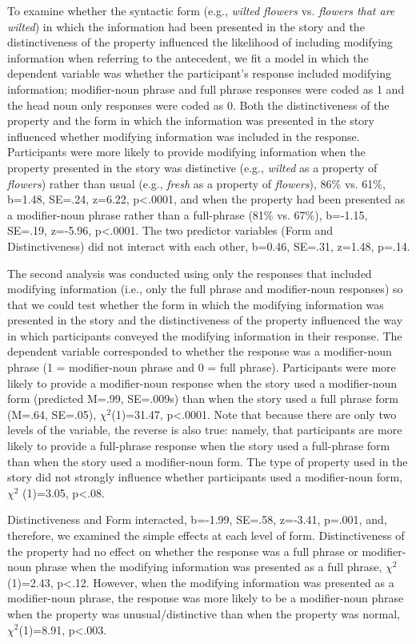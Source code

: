 \documentclass[output=paper]{langsci/langscibook}
\begin{document}
To examine whether the syntactic form (e.g., \textit{wilted flowers}
vs. \textit{flowers that are wilted}) in which the information had
been presented in the story and the distinctiveness of the property
influenced the likelihood of including modifying information when
referring to the antecedent, we fit a model in which the dependent
variable was whether the participant’s response included modifying
information; modifier-noun phrase and full phrase responses were coded
as 1 and the head noun only responses were coded as 0. Both the
distinctiveness of the property and the form in which the information
was presented in the story influenced whether modifying information
was included in the response. Participants were more likely to provide
modifying information when the property presented in the story was
distinctive (e.g., \textit{wilted} as a property of \textit{flowers})
rather than usual (e.g., \textit{fresh} as a property of
\textit{flowers}), 86\% vs. 61\%, b=1.48, SE=.24, z=6.22, p<.0001, and
when the property had been presented as a modifier-noun phrase rather
than a full-phrase (81\% vs. 67\%), b=-1.15, SE=.19, z=-5.96,
p<.0001. The two predictor variables (Form and Distinctiveness) did
not interact with each other, b=0.46, SE=.31, z=1.48, p=.14.

The second analysis was conducted using only the responses that
included modifying information (i.e., only the full phrase and
modifier-noun responses) so that we could test whether the form in
which the modifying information was presented in the story and the
distinctiveness of the property influenced the way in which
participants conveyed the modifying information in their response. The
dependent variable corresponded to whether the response was a
modifier-noun phrase (1 = modifier-noun phrase and 0 = full
phrase). Participants were more likely to provide a modifier-noun
response when the story used a modifier-noun form (predicted M=.99,
SE=.009s) than when the story used a full phrase form (M=.64, SE=.05),
$\chi^2$(1)=31.47, p<.0001. Note that because there are only two
levels of the variable, the reverse is also true: namely, that
participants are more likely to provide a full-phrase response when
the story used a full-phrase form than when the story used a
modifier-noun form. The type of property used in the story did not
strongly influence whether participants used a modifier-noun form,
$\chi^2$ (1)=3.05, p<.08.

Distinctiveness and Form interacted, b=-1.99, SE=.58, z=-3.41, p=.001,
and, therefore, we examined the simple effects at each level of
form. Distinctiveness of the property had no effect on whether the
response was a full phrase or modifier-noun phrase when the modifying
information was presented as a full phrase, $\chi^2$(1)=2.43,
p<.12. However, when the modifying information was presented as a
modifier-noun phrase, the response was more likely to be a
modifier-noun phrase when the property was unusual/distinctive than
when the property was normal, $\chi^2$(1)=8.91, p<.003.
\end{document}
